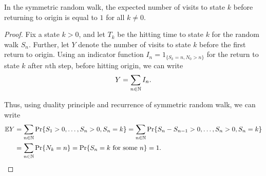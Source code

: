 \documentclass[a4paper,10pt,english]{article}
\begin{document}
\begin{prop}
In the symmetric random walk, the expected number of visits to state $k$ before returning to origin is equal to $1$ for all $k \neq 0$.
\end{prop}
\begin{proof}
Fix a state $k > 0$, and let $T_k$ be the hitting time to state $k$ for the random walk $S_n$. 
Further, let $Y$ denote the number of visits to state $k$ before the first return to origin. 
Using an indicator function  $I_n = 1_{\{S_k = n, N_0 > n\}}$ for the return to state $k$ after $n$th step, before hitting origin, 
we can write  
\begin{align*}
Y = \sum_{n \in \mathbb{N}} I_n.
\end{align*}

Thus, using duality principle and recurrence of symmetric random walk, we can write
\begin{align*}
\mathbb{E} Y &= \sum_{n \in \mathbb{N}} \Pr\{S_1 > 0, \dots, S_n > 0, S_n = k\}= \sum_{n \in \mathbb{N}}\Pr\{S_n - S_{n-1} > 0,\dots, S_n > 0, S_n = k\}\\
&= \sum_{n \in \mathbb{N}} \Pr\{N_k = n\} = \Pr\{S_n = k \text{ for some }n\} = 1.
\end{align*}
\end{proof}
\end{document}
